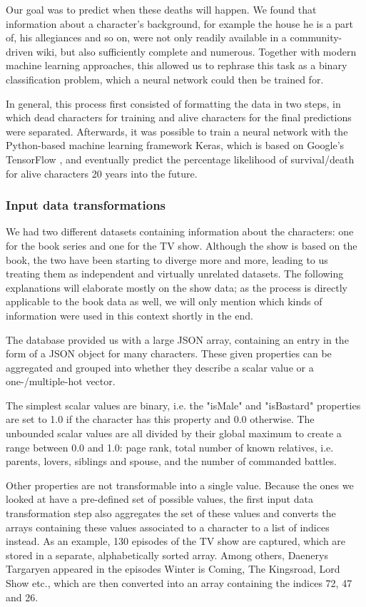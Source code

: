 \documentclass{bioinfo}
\begin{document}
Our goal was to predict when these deaths will happen. We found that information about a character's background, for example the house he is a part of, his allegiances and so on, were not only readily available in a community-driven wiki, but also sufficiently complete and numerous. Together with modern machine learning approaches, this allowed us to rephrase this task as a binary classification problem, which a neural network could then be trained for.

In general, this process first consisted of formatting the data in two steps, in which dead characters for training and alive characters for the final predictions were separated. Afterwards, it was possible to train a neural network with the Python-based machine learning framework Keras, which is based on Google's TensorFlow \cite{keras}, and eventually predict the percentage likelihood of survival/death for alive characters 20 years into the future.

\subsubsection{Input data transformations}

We had two different datasets containing information about the characters: one for the book series and one for the TV show. Although the show is based on the book, the two have been starting to diverge more and more, leading to us treating them as independent and virtually unrelated datasets. The following explanations will elaborate mostly on the show data; as the process is directly applicable to the book data as well, we will only mention which kinds of information were used in this context shortly in the end.

The database provided us with a large JSON array, containing an entry in the form of a JSON object for many characters. These given properties can be aggregated and grouped into whether they describe a scalar value or a one-/multiple-hot vector.

The simplest scalar values are binary, i.e. the "isMale" and "isBastard" properties are set to 1.0 if the character has this property and 0.0 otherwise. The unbounded scalar values are all divided by their global maximum to create a range between 0.0 and 1.0: page rank, total number of known relatives, i.e. parents, lovers, siblings and spouse, and the number of commanded battles.

Other properties are not transformable into a single value. Because the ones we looked at have a pre-defined set of possible values, the first input data transformation step also aggregates the set of these values and converts the arrays containing these values associated to a character to a list of indices instead. As an example, 130 episodes of the TV show are captured, which are stored in a separate, alphabetically sorted array. Among others, Daenerys Targaryen appeared in the episodes Winter is Coming, The Kingsroad, Lord Show etc., which are then converted into an array containing the indices 72, 47 and 26.
\end{document}
